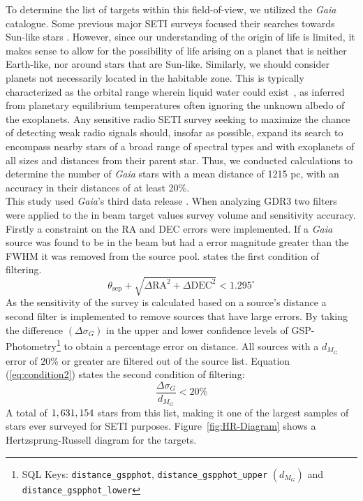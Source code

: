 To determine the list of targets within this field-of-view, we utilized the \textit{Gaia} catalogue. Some previous major SETI surveys focused their searches towards Sun-like stars \citep{Tarter:1996jf}. However, since our understanding of the origin of life is limited, it makes sense to allow for the possibility of life arising on a planet that is neither Earth-like, nor around stars that are Sun-like. Similarly, we should consider planets not necessarily located in the habitable zone. This is typically characterized as the orbital range wherein liquid water could exist~\citep{KASTING1993108}, as inferred from planetary equilibrium temperatures often ignoring the unknown albedo of the exoplanets. Any sensitive radio SETI survey seeking to maximize the chance of detecting weak radio signals should, insofar as possible, expand its search to encompass nearby stars of a broad range of spectral types and with exoplanets of all sizes and distances from their parent star. Thus, we conducted calculations to determine the number of \textit{Gaia} stars with a mean distance of 1215 pc, with an accuracy in their distances of at least 20\%. \\

This study used \textit{Gaia}'s third data release  \citep[GDR3;][]{2023GDR3, astroquery}. When analyzing GDR3 two filters were applied to the in beam target values survey volume and sensitivity accuracy. Firstly a constraint on the RA and DEC errors were implemented. If a \textit{Gaia} source was found to be in the beam but had a error magnitude greater than the FWHM it was removed from the source pool.  states the first condition of filtering. 
\begin{equation}
    \theta_\text{sep} + \sqrt{\Delta \text{RA}^2 + \Delta \text{DEC}^2} < 1.295^\circ 
    \label{eq:condition1}
\end{equation}
As the sensitivity of the survey is calculated based on a source's distance a second filter is implemented to remove sources that have large errors. By taking the difference $(\Delta \sigma_G)$ in the upper and lower confidence levels of GSP-Photometry\footnote{SQL Keys: \texttt{distance\_gspphot}, \texttt{distance\_gspphot\_upper} $(d_{M_G})$ and \texttt{distance\_gspphot\_lower}} to obtain a percentage error on distance. All sources with a $d_{M_G}$ error of 20\% or greater are filtered out of the source list. Equation (\ref{eq:condition2}) states the second condition of filtering:
\begin{equation}
    \dfrac{\Delta \sigma_G}{d_{M_G}} < 20\% 
    \label{eq:condition2}
\end{equation}
A total of $1,631,154$ stars from this list, making it one of the largest samples of stars ever surveyed for SETI purposes. Figure~\ref{fig:HR-Diagram} shows a Hertzsprung-Russell diagram for the targets. 

